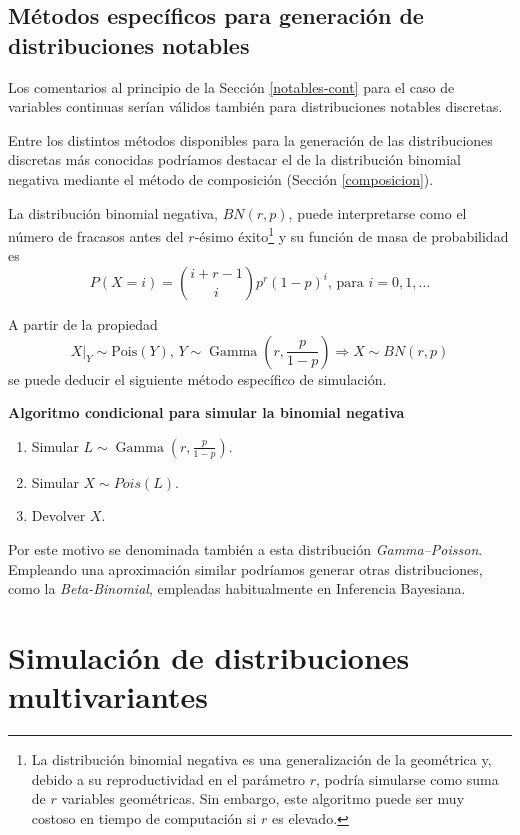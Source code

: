 \documentclass[
]{book}
\theoremstyle{break}
\theoremstyle{definition}
\theoremstyle{definition}
\theoremstyle{definition}
\theoremstyle{definition}
\theoremstyle{remark}
\begin{document}
\hypertarget{notables-disc}{%
\section{Métodos específicos para generación de distribuciones notables}\label{notables-disc}}

Los comentarios al principio de la Sección \ref{notables-cont} para el caso de variables continuas serían válidos también para distribuciones notables discretas.

Entre los distintos métodos disponibles para la generación de las distribuciones discretas más conocidas podríamos destacar el de la distribución binomial negativa mediante el método de composición (Sección \ref{composicion}).

La distribución binomial negativa, \(BN(r, p)\), puede interpretarse como el número de fracasos antes del \(r\)-ésimo éxito\footnote{La distribución binomial negativa es una generalización de la geométrica y, debido a su reproductividad en el parámetro \(r\), podría simularse como suma de \(r\) variables geométricas. Sin embargo, este algoritmo puede ser muy costoso en tiempo de computación si \(r\) es elevado.} y su función de masa de probabilidad es
\[P(X = i) = \binom{i+r-1}i p^r (1-p)^i \text{, para }i=0,1,\ldots\]

A partir de la propiedad
\[X|_{Y} \sim \text{Pois}\left(  Y\right)  \text{, }Y \sim \operatorname{Gamma} \left( r, \frac{p}{1-p}\right)  \Rightarrow X \sim BN(r, p)\]
se puede deducir el siguiente método específico de simulación.

\textbf{Algoritmo condicional para simular la binomial negativa}

\begin{enumerate}
\def\labelenumi{\arabic{enumi}.}
\item
  Simular \(L \sim \operatorname{Gamma}\left( r, \frac{p}{1-p} \right)\).
\item
  Simular \(X \sim Pois \left( L\right)\).
\item
  Devolver \(X\).
\end{enumerate}

Por este motivo se denominada también a esta distribución \emph{Gamma--Poisson}. Empleando una aproximación similar podríamos generar otras distribuciones, como la \emph{Beta-Binomial}, empleadas habitualmente en Inferencia Bayesiana.

\hypertarget{simulaciuxf3n-de-distribuciones-multivariantes}{%
\chapter{Simulación de distribuciones multivariantes}\label{simulaciuxf3n-de-distribuciones-multivariantes}}
\end{document}
